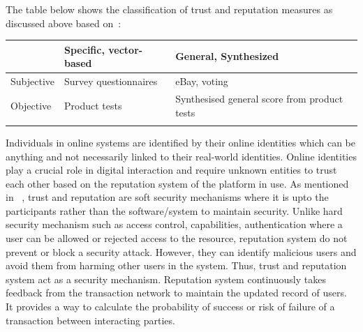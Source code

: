 The table below shows the classification of trust and reputation measures as
discussed above based on~\cite{ josang2007survey}: \\
 \begin{center}\label{table:classificationTrust}
	\begin{tabularx}{\textwidth }{|X| X| X| }
		\hline
		 & Specific, vector-based & General, Synthesized \\
		 \hline
		Subjective & Survey questionnaires & eBay, voting \\
		\hline
		Objective & Product tests & Synthesised general score from product tests \\
		\hline
	\caption{Trust and Reputation measures classification}
	\end{tabularx}
\end{center}
Individuals in online systems are identified by their online identities which
can be anything and not necessarily linked to their real-world identities.
Online identities play a crucial role in digital interaction and require
unknown entities to trust each other based on the reputation system of the
platform in use. As mentioned in ~\cite{rasmusson1996simulated}, trust and
reputation are soft security mechanisms where it is upto the participants
rather than the software/system to maintain security. Unlike hard security
mechanism such as access control, capabilities, authentication where a user can
be allowed or rejected access to the resource, reputation system do not prevent
or block a security attack. However, they can identify malicious users and
avoid them from harming other users in the system. Thus, trust and reputation
system act as a security mechanism. Reputation system continuously takes
feedback from the transaction network to maintain the updated record of users.
It provides a way to calculate the probability of success or risk of failure of
a transaction between interacting parties.  


